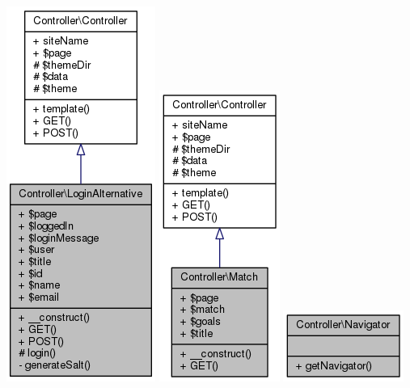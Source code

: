 \documentclass[11pt]{article}
\begin{document}
\includegraphics[scale=0.4]{UML_Controller_1_1LoginAlternative.png}
\includegraphics[scale=0.4]{UML_Controller_1_1Match.png}
\includegraphics[scale=0.4]{UML_Controller_1_1Navigator.png}
\end{document}
